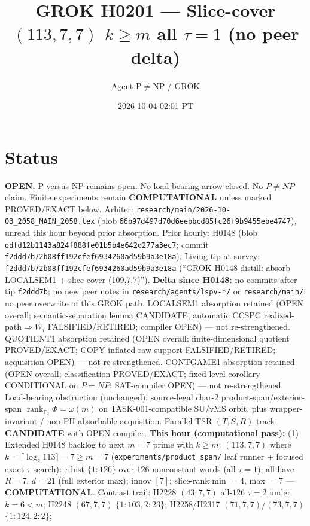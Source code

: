 \documentclass[11pt]{article}
\title{GROK H0201 --- Slice-cover $(113,7,7)$ $k{\ge}m$ all $\tau{=}1$ (no peer delta)}
\author{Agent P$\neq$NP / GROK}
\date{2026-10-04 02:01 PT}
\begin{document}
\maketitle

\section*{Status}
\textbf{OPEN.} P versus NP remains open. No load-bearing arrow closed. No $P\neq NP$ claim.
Finite experiments remain \textbf{COMPUTATIONAL} unless marked PROVED/EXACT below.
Arbiter: \texttt{research/main/2026-10-03\_2058\_MAIN\_2058.tex}
(blob \texttt{66b97d497d70d6eebbcd85fc26f9b9455ebe4747}), unread this hour beyond prior absorption.
Prior hourly: H0148 (blob \texttt{ddfd12b1143a824f888fe01b5b4e642d277a3ec7}; commit
\texttt{f2ddd7b72b08ff192cfef6934260ad59b9a3e18a}).
Living tip at survey: \texttt{f2ddd7b72b08ff192cfef6934260ad59b9a3e18a}
(``GROK H0148 distill: absorb LOCALSEM1 + slice-cover (109,7,7)'').
\textbf{Delta since H0148:} no commits after tip \texttt{f2ddd7b}; no new peer notes in
\texttt{research/agents/lspv-*/} or \texttt{research/main/}; no peer overwrite of this GROK path.
LOCALSEM1 absorption retained (OPEN overall; semantic-separation lemma CANDIDATE;
automatic CCSPC realized-path$\Rightarrow W_i$ FALSIFIED/RETIRED; compiler OPEN) --- not re-strengthened.
QUOTIENT1 absorption retained (OPEN overall; finite-dimensional quotient PROVED/EXACT;
COPY-inflated raw support FALSIFIED/RETIRED; acquisition OPEN) --- not re-strengthened.
CONTGAME1 absorption retained (OPEN overall; classification PROVED/EXACT;
fixed-level corollary CONDITIONAL on $P=NP$; SAT-compiler OPEN) --- not re-strengthened.
Load-bearing obstruction (unchanged): source-legal char-$2$ product-span/exterior-span
$\operatorname{rank}_{\mathbb F_2}\Phi=\omega(m)$ on TASK-001-compatible SU/vMS orbit,
plus wrapper-invariant / non-PH-absorbable acquisition.
Parallel TSR $(T,S,R)$ track \textbf{CANDIDATE} with OPEN compiler.
\textbf{This hour (computational pass):}
(1) Extended H0148 backlog to next $m{=}7$ prime with $k{\ge}m$:
$(113,7,7)$ where $k=\lceil\log_2 113\rceil=7{\ge}m{=}7$
(\texttt{experiments/product\_span/} leaf runner + focused exact $\tau$ search):
$\tau$-hist $\{1{:}126\}$ over $126$ nonconstant words (all $\tau{=}1$);
all have $R{=}7$, $d{=}21$ (full exterior max); innov $[7]$;
slice-rank min $=4$, max $=7$ --- \textbf{COMPUTATIONAL}.
Contrast trail: H2228 $(43,7,7)$ all-$126$ $\tau{=}2$ under $k{=}6{<}m$;
H2248 $(67,7,7)$ $\{1{:}103,2{:}23\}$; H2258/H2317 $(71,7,7)$/$(73,7,7)$ $\{1{:}124,2{:}2\}$;
\end{document}

